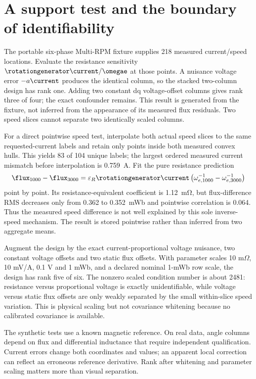 \section{A support test and the boundary of identifiability}
The portable six-phase Multi-RPM fixture supplies 218 measured current/speed
locations. Evaluate the resistance sensitivity $\rotationgenerator\current/
\omegae$ at those points. A nuisance voltage error $-a\current$ produces
the identical column, so the stacked two-column design has rank one.
Adding two constant dq voltage-offset columns gives rank three of four;
the exact confounder remains. This result is generated from the fixture,
not inferred from the appearance of its measured flux residuals.
Two speed slices cannot separate two identically scaled columns.

For a direct pointwise speed test, interpolate both actual speed slices to the
same requested-current labels and retain only points inside both measured
convex hulls. This yields 83 of 104 unique labels; the largest ordered measured
current mismatch before interpolation is \SI{0.759}{\ampere}. Fit the pure
resistance prediction
\begin{equation}
 \flux_{1000}-\flux_{3000}
 =\varepsilon_R\rotationgenerator\current
 \left(\omega_{e,1000}^{-1}-\omega_{e,3000}^{-1}\right)
\end{equation}
point by point. Its resistance-equivalent coefficient is
\SI{1.12}{\milli\ohm}, but flux-difference RMS decreases only from 0.362 to
\SI{0.352}{\milli\weber} and pointwise correlation is 0.064. Thus the measured
speed difference is not well explained by this sole inverse-speed mechanism.
The result is stored pointwise rather than inferred from two aggregate means.

Augment the design by the exact current-proportional voltage nuisance, two
constant voltage offsets and two static flux offsets. With parameter scales
10 m$\Omega$, 10 mV/A, 0.1 V and 1 mWb, and a declared nominal 1-mWb row scale,
the design has rank five of six. The nonzero scaled condition number is about
2481: resistance versus proportional voltage is exactly unidentifiable, while
voltage versus static flux offsets are only weakly separated by the small
within-slice speed variation. This is physical scaling but not covariance
whitening because no calibrated covariance is available.

The synthetic tests use a known magnetic reference. On real data, angle
columns depend on flux and differential inductance that require independent
qualification. Current errors change both coordinates and values; an apparent
local correction can reflect an erroneous reference derivative. Rank after
whitening and parameter scaling matters more than visual separation.

